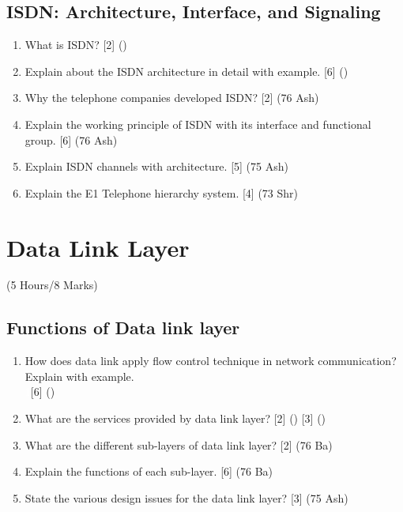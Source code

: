 \documentclass[12pt]{article}
\newcommand{\enter}{\\\textcolor{white}{1}}
\begin{document}
	\subsection{ISDN: Architecture, Interface, and Signaling}
		\begin{enumerate}[noitemsep, topsep=0pt]
			\item What is ISDN? \hfill [2] ()
			
			\item Explain about the ISDN architecture in detail with example. \hfill [6] ()
			
			\item Why the telephone companies developed ISDN? \hfill [2] (76 Ash)
			
			\item Explain the working principle of ISDN with its interface and functional group. \hfill [6] (76 Ash)
			
			\item Explain ISDN channels with architecture. \hfill [5] (75 Ash)
			
			\item Explain the E1 Telephone hierarchy system. \hfill [4] (73 Shr)
		\end{enumerate}

	\pagebreak

\section{Data Link Layer}
	\begin{center}(5 Hours/8 Marks)\end{center}
	\subsection{Functions of Data link layer}
		\begin{enumerate}[noitemsep, topsep=0pt]
			\item How does data link apply flow control technique in network communication? Explain with example.
			\enter\hfill [6] ()

			\item What are the services provided by data link layer? \hfill [2] () [3] ()

			\item What are the different sub-layers of data link layer? \hfill [2] (76 Ba)

			\item Explain the functions of each sub-layer. \hfill [6] (76 Ba)

			\item State the various design issues for the data link layer? \hfill [3] (75 Ash)
		\end{enumerate}
		
\end{document}
